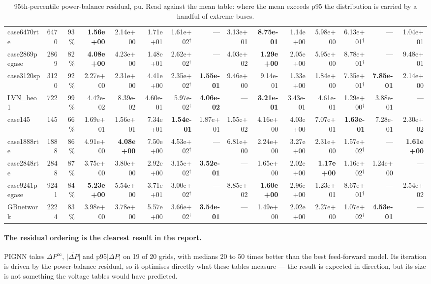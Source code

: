 \documentclass[10pt]{article}
\begin{document}
\begin{landscape}
\begin{table}[H]
\begin{tabular}{lrr rrrrrr rrrrrr}
case6470rte & 6470 & 93\% & \textbf{1.56e+00} & 2.14e+00 & 1.71e+01 & 1.61e+02$^\dagger$ & --- & 3.13e+01 & \textbf{8.75e-01} & 1.14e+00 & 5.98e+00 & 6.13e+01$^\dagger$ & --- & 1.04e+01 \\
case2869pegase & 2869 & 82\% & \textbf{4.08e+00} & 4.23e+00 & 1.48e+01 & 2.62e+02$^\dagger$ & --- & 4.03e+02 & \textbf{1.29e+00} & 2.05e+00 & 5.95e+00 & 8.78e+01$^\dagger$ & --- & 9.48e+01 \\
case3120sp & 3120 & 92\% & 2.27e+00 & 2.31e+00 & 4.41e+00 & 2.35e+02$^\dagger$ & \textbf{1.55e-01} & 9.46e+00 & 9.14e-01 & 1.33e+00 & 1.84e+00 & 7.35e+01$^\dagger$ & \textbf{7.85e-01} & 2.14e+00 \\
LVN\_heo1 & 722 & 99\% & 4.42e-02 & 8.39e-02 & 4.60e-01 & 5.97e-02$^\dagger$ & \textbf{4.06e-02} & --- & \textbf{3.21e-01} & 3.43e-01 & 4.61e-01 & 1.29e+00$^\dagger$ & 3.88e-01 & --- \\
case145 & 145 & 66\% & 1.69e+01 & 1.56e+01 & 7.34e+01 & \textbf{1.54e-01} & 1.87e+01 & 1.55e+02 & 4.16e+00 & 4.03e+00 & 7.07e+01 & \textbf{1.63e-01} & 7.28e-01 & 2.30e+02 \\
case1888rte & 1888 & 86\% & 4.91e+00 & \textbf{4.08e+00} & 7.50e+00 & 4.53e+02$^\dagger$ & --- & 6.81e+00 & 2.24e+00 & 3.27e+00 & 2.31e+00 & 1.57e+02$^\dagger$ & --- & \textbf{1.61e+00} \\
case2848rte & 2848 & 87\% & 3.75e+00 & 3.80e+00 & 2.92e+00 & 3.15e+02$^\dagger$ & \textbf{3.52e-01} & --- & 1.65e+00 & 2.02e+00 & \textbf{1.17e+00} & 1.16e+02$^\dagger$ & 1.24e+00 & --- \\
case9241pegase & 9241 & 84\% & \textbf{5.23e+00} & 5.54e+00 & 3.71e+01 & 3.00e+02$^\dagger$ & --- & 8.85e+02 & \textbf{1.60e+00} & 2.96e+00 & 1.23e+01 & 8.67e+01$^\dagger$ & --- & 2.54e+02 \\
GBnetwork & 2224 & 83\% & 3.98e+00 & 3.78e+00 & 5.57e+00 & 3.66e+02$^\dagger$ & \textbf{3.54e-01} & --- & 1.49e+00 & 2.02e+00 & 2.27e+00 & 1.07e+02$^\dagger$ & \textbf{4.53e-01} & --- \\
\bottomrule
\end{tabular}
\caption{95th-percentile power-balance residual, pu. Read against the mean table: where the mean exceeds p95 the distribution is carried by a handful of extreme buses.}
\end{table}
\end{landscape}

\paragraph{The residual ordering is the clearest result in the report.} PIGNN
takes $\Delta P^{\infty}$, $\overline{|\Delta P|}$ and p95$|\Delta P|$ on 19 of
20 grids, with medians 20 to 50 times better than the best feed-forward model.
Its iteration is driven by the power-balance residual, so it optimises directly
what these tables measure --- the result is expected in direction, but its size
is not something the voltage tables would have predicted.
\end{document}
